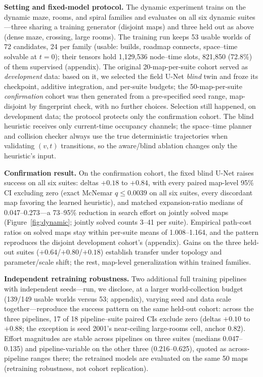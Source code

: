 \documentclass[letterpaper]{article} %
\begin{document}
\textbf{Setting and fixed-model protocol.} The dynamic experiment trains on the dynamic maze, rooms, and spiral families and evaluates on all six dynamic suites---three sharing a training generator (disjoint maps) and three held out as above (dense maze, crossing, large rooms). The training run keeps 53 usable worlds of 72 candidates, 24 per family (usable: builds, roadmap connects, space--time solvable at $t{=}0$); their tensors hold 1{,}129{,}536 node--time slots, 821{,}850 (72.8\%) of them supervised (appendix). The original 20-map-per-suite cohort served as \emph{development} data: based on it, we selected the field U-Net \emph{blind} twin and froze its checkpoint, additive integration, and per-suite budgets; the 50-map-per-suite \emph{confirmation} cohort was then generated from a pre-specified seed range, map-disjoint by fingerprint check, with no further choices. Selection still happened, on development data; the protocol protects only the confirmation cohort. The blind heuristic receives only current-time occupancy channels; the space--time planner and collision checker always use the true deterministic trajectories when validating $(v,t)$ transitions, so the aware/blind ablation changes only the heuristic's input.

\textbf{Confirmation result.} On the confirmation cohort, the fixed blind U-Net raises success on all six suites: deltas $+0.18$ to $+0.84$, with every paired map-level 95\% CI excluding zero (exact McNemar $q \leq 0.0039$ on all six suites, every discordant map favoring the learned heuristic), and matched expansion-ratio medians of 0.047--0.273---a 73--95\% reduction in search effort on jointly solved maps (Figure~\ref{fig:dynamic}; jointly solved counts 3--41 per suite). Empirical path-cost ratios on solved maps stay within per-suite means of 1.008--1.164, and the pattern reproduces the disjoint development cohort's (appendix). Gains on the three held-out suites ($+0.64$/$+0.80$/$+0.18$) establish transfer under topology and parameter/scale shift; the rest, map-level generalization within trained families.

\textbf{Independent retraining robustness.} Two additional full training pipelines with independent seeds---run, we disclose, at a larger world-collection budget (139/149 usable worlds versus 53; appendix), varying seed and data scale together---reproduce the success pattern on the same held-out cohort: across the three pipelines, 17 of 18 pipeline--suite paired CIs exclude zero (deltas $+0.10$ to $+0.88$; the exception is seed 2001's near-ceiling large-rooms cell, anchor 0.82). Effort magnitudes are stable across pipelines on three suites (medians 0.047--0.135) and pipeline-variable on the other three (0.216--0.625), quoted as across-pipeline ranges there; the retrained models are evaluated on the same 50 maps (retraining robustness, not cohort replication).
\end{document}
